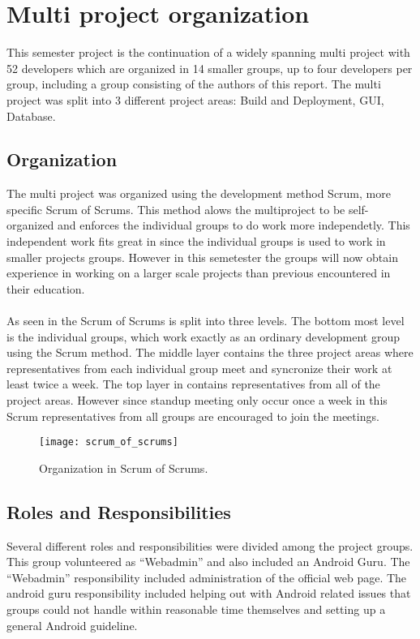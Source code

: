 
\section{Multi project organization}

This semester project is the continuation of a widely spanning multi project with 52 developers which are organized in 14 smaller groups, up to four developers per group, including a group consisting of the authors of this report. The multi project was split into 3 different project areas: Build and Deployment, GUI, Database. 

\subsection{Organization}
The multi project was organized using the development method Scrum\parencite{scrum}, more specific Scrum of Scrums. This method alows the multiproject to be self-organized and enforces the individual groups to do work more independetly. This independent work fits great in since the individual groups is used to work in smaller projects groups. However in this semetester the groups will now obtain experience in working on a larger scale projects than previous encountered in their education. 
\\\\
As seen in  the Scrum of Scrums is split into three levels. The bottom most level is the individual groups, which work exactly as an ordinary development group using the Scrum method. The middle layer contains the three project areas where representatives from each individual group meet and syncronize their work at least twice a week. The top layer in  contains representatives from all of the project areas. However since standup meeting only occur once a week in this Scrum representatives from all groups are encouraged to join the meetings.

\begin{figure}[!htbp]
  \centering
    \texttt{[image: scrum\_of\_scrums]}
    \caption{Organization in Scrum of Scrums.}
    \label{fig:scrum_of_scrums}
\end{figure}

\subsection{Roles and Responsibilities}
Several different roles and responsibilities were divided among the project groups. This group volunteered as ``Webadmin'' and also included an Android Guru. The ``Webadmin'' responsibility included administration of the official \giraf web page. The android guru responsibility included helping out with Android related issues that groups could not handle within reasonable time themselves and setting up a general Android guideline. 